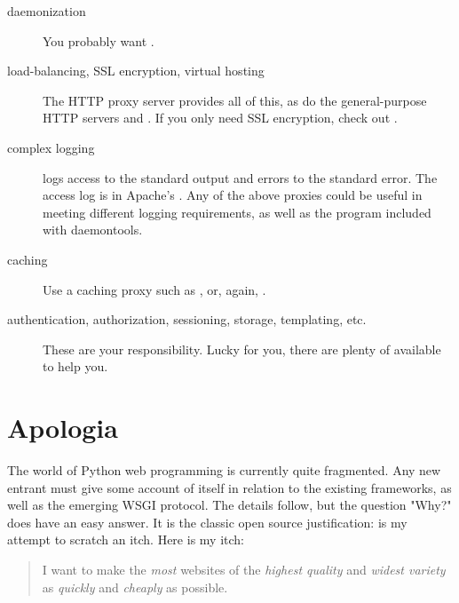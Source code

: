 \begin{description}

\item[daemonization]
    {You probably want .}

\item[load-balancing, SSL encryption, virtual hosting]
    {The HTTP proxy server  provides
    all of this, as do the general-purpose HTTP servers
     and
    . If you only need SSL encryption,
    check out .}

\item[complex logging]
    { logs access to the standard output and errors to the standard
    error. The access log is in Apache's . Any of the
    above proxies could be useful in meeting different logging requirements, as
    well as the  program included with daemontools.}

\item[caching]
    {Use a caching proxy such as , or,
    again, .}

\item[authentication, authorization, sessioning, storage, templating, etc.]
    {These are your responsibility. Lucky for you, there are plenty of
     available to help
    you.}

\end{description}



\section{Apologia \label{apologia}}

The world of Python web programming is currently quite fragmented. Any new
entrant must give some account of itself in relation to the existing frameworks,
as well as the emerging WSGI protocol. The details follow, but the question
"Why?" does have an easy answer. It is the classic open source justification:
 is my attempt to scratch an itch. Here is my itch:

\begin{quote} I want to make the \emph{most} websites of the \emph{highest
quality} and \emph{widest variety} as \emph{quickly} and \emph{cheaply} as
possible. \end{quote}

